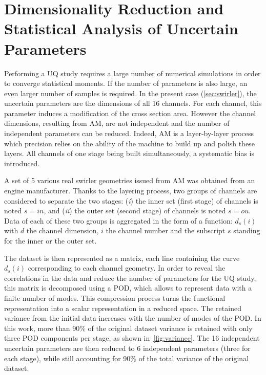 \section{Dimensionality Reduction and Statistical Analysis of Uncertain Parameters}\label{sec:dim}
Performing a UQ study requires a large number of numerical simulations in order to converge statistical moments. If the number of parameters is also large, an even larger number of samples is required. In the present case (\cref{sec:swirler}), the uncertain parameters are the dimensions of all 16 channels. For each channel, this parameter induces a modification of the cross section area. However the channel dimensions, resulting from AM, are not independent and the number of independent parameters can be reduced. Indeed, AM is a layer-by-layer process which precision relies on the ability of the machine to build up and polish these layers. All channels of one stage being built simultaneously, a systematic bias is introduced. 

A set of 5 various real swirler geometries issued from AM was obtained from an engine manufacturer. Thanks to the layering process, two groups of channels are considered to separate the two stages: (\emph{i}) the inner set (first stage) of channels is noted $s=in$, and (\emph{ii}) the outer set (second stage) of channels is noted $s=ou$. Data of each of these two groups is aggregated in the form of a function: $d_{s}(i)$ with $d$ the channel dimension, $i$ the channel number and the subscript $s$ standing for the inner or the outer set. 

The dataset is then represented as a matrix, each line containing the curve $d_{s}(i)$ corresponding to each channel geometry. In order to reveal the correlations in the data and reduce the number of parameters for the UQ study, this matrix is decomposed using a POD, which allows to represent data with a finite number of modes. This compression process turns the functional representation into a scalar representation in a reduced space. The retained variance from the initial data increases with the number of modes of the POD. In this work, more than 90\% of the original dataset variance is retained with only three POD components per stage, as shown in~\cref{fig:variance}. The 16 independent uncertain parameters are then reduced to 6 independent parameters (three for each stage), while still accounting for 90\% of the total variance of the original dataset. 

